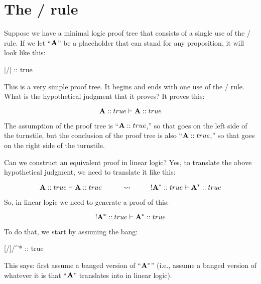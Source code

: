 \documentclass[../../../main.tex]{subfiles}
\begin{document}
\section{The \startrule/ rule}

Suppose we have a minimal logic proof tree that consists of a single use of the \startrule/ rule. If we let ``$\mathbf{A}$'' be a placeholder that can stand for any proposition, it will look like this:

\begin{prooftree*}
  \hypo{}
  [\startrule/]{ :: true}
\end{prooftree*}

\noindent
This is a very simple proof tree. It begins and ends with one use of the \startrule/ rule. What is the hypothetical judgment that it proves? It proves this:

\begin{equation*}
  \nd{A} :: true \ndturnstile/ \nd{A} :: true
\end{equation*}

\noindent
The assumption of the proof tree is ``$\mathbf{A} :: true$,'' so that goes on the left side of the turnstile, but the conclusion of the proof tree is also ``$\mathbf{A} :: true$,'' so that goes on the right side of the turnstile.

Can we construct an equivalent proof in linear logic? Yes, to translate the above hypothetical judgment, we need to translate it like this:

\begin{equation*}
  \nd{A} :: true \ndturnstile/ \nd{A} :: true 
  \hskip 1cm \rightsquigarrow \hskip 1cm
  \bang/\nd{A}^{*} :: true \ndturnstile/ \nd{A}^{*} :: true
\end{equation*}

\noindent
So, in linear logic we need to generate a proof of this:

\begin{equation*}
  \bang/\nd{A}^{*} :: true \ndturnstile/ \nd{A}^{*} :: true
\end{equation*}

\noindent
To do that, we start by assuming the bang:

\begin{prooftree*}
  \hypo{}
  [\startrule/]{\bang/^{*} :: true}
\end{prooftree*}

\noindent
This says: first assume a banged version of ``$\mathbf{A}^{*}$'' (i.e., assume a banged version of whatever it is that ``$\mathbf{A}$'' translates into in linear logic). 
\end{document}
